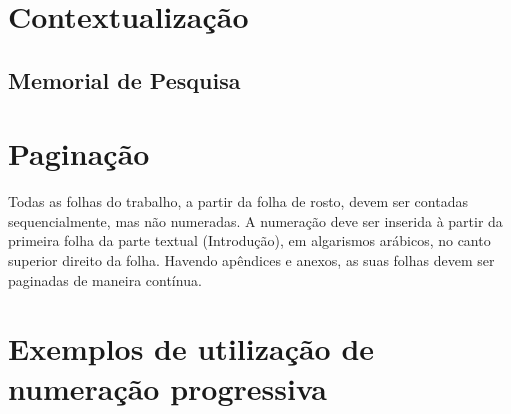 









\section{Contextualização}

\subsection{Memorial de Pesquisa}


\section{Paginação}

Todas as folhas do trabalho, a partir da folha de rosto, devem ser contadas sequencialmente, mas não numeradas. A numeração deve ser inserida à partir da primeira folha da parte textual (Introdução), em algarismos arábicos, no canto superior direito da folha. Havendo apêndices e anexos, as suas folhas devem ser paginadas de maneira contínua.

\section{Exemplos de utilização de numeração progressiva}

